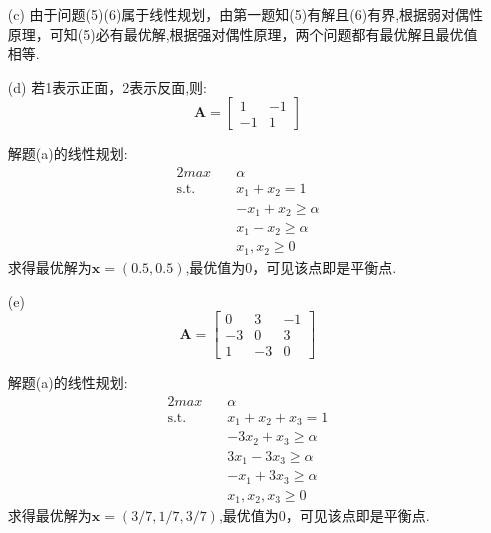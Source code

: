 \documentclass[UTF8]{ctexart}
\begin{document}
\begin{enumerate}
\begin{enumerate}
\item[(c)] 由于问题(5)(6)属于线性规划，由第一题知(5)有解且(6)有界,根据弱对偶性原理，可知(5)必有最优解,根据强对偶性原理，两个问题都有最优解且最优值相等.

\item[(d)] 若1表示正面，2表示反面,则:
\[\bm{A}=\begin{bmatrix}
   	1&-1\\
   	-1&1\end{bmatrix}\]

解题(a)的线性规划:
\begin{alignat}{2}
max \quad & \alpha\nonumber\\
\mbox{s.t.}\quad &
x_1+x_2=1\nonumber\\
&-x_1+x_2\geq \alpha\nonumber\\
&x_1-x_2\geq \alpha\nonumber\\
& x_1,x_2\geq 0
\end{alignat}
求得最优解为$\bm{x}=(0.5,0.5)$,最优值为0，可见该点即是平衡点.

\item[(e)]
\[\bm{A}=\begin{bmatrix}
   	0&3&-1\\
-3&0&3\\
1&-3&0\end{bmatrix}\]

解题(a)的线性规划:
\begin{alignat}{2}
max \quad & \alpha\nonumber\\
\mbox{s.t.}\quad &
x_1+x_2+x_3=1\nonumber\\
&-3x_2+x_3\geq \alpha\nonumber\\
&3x_1-3x_3\geq \alpha\nonumber\\
&-x_1+3x_3\geq \alpha\nonumber\\
& x_1,x_2,x_3\geq 0
\end{alignat}
求得最优解为$\bm{x}=(3/7,1/7,3/7)$,最优值为0，可见该点即是平衡点.
\end{enumerate}
\end{enumerate}
\end{document}
